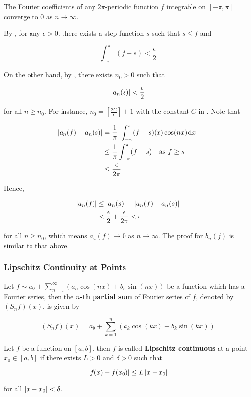 \documentclass[a4paper,12pt]{article}
\begin{document}
\begin{thm}
  The Fourier coefficients of any $2\pi$-periodic function $f$ integrable on $[-\pi,\pi]$ converge to $0$ as $n\to\infty$.\n

  \prf By \rpst[\sctd{1}], for any $\epsilon>0$, there exists a step function $s$ such that $s\leq f$ and

  $$\int_{-\pi}^{\pi}(f-s)<\frac{\epsilon}{2}$$\s

  On the other hand, by \rpst[\sctd{2}], there exists $n_{0}>0$ such that

  $$\left| a_{n}(s)\right|<\frac{\epsilon}{2}$$\s

  for all $n\geq n_{0}$. For instance, $n_{0}=[\frac{2C}{\epsilon}]+1$ with the constant $C$ in \rpst[\sctd{2}]. Note that

  $$\begin{aligned}[t]
    \left| a_{n}(f)-a_{n}(s)\right|&=\frac{1}{\pi}\left| \int_{-\pi}^{\pi}(f-s)(x)\cos(nx)\,\mathrm{d} x\right|\\
    &\leq\frac{1}{\pi}\int_{-\pi}^{\pi}(f-s)\;\;\;\;\text{as }f\geq s\\
    &\leq\frac{\epsilon}{2\pi}
  \end{aligned}$$\s

  Hence,

  $$\begin{aligned}[t]
    \left| a_{n}(f)\right|&\leq\left| a_{n}(s)\right|-\left| a_{n}(f)-a_{n}(s)\right|\\
    &<\frac{\epsilon}{2}+\frac{\epsilon}{2\pi}<\epsilon
  \end{aligned}$$\s

  for all $n\geq n_{0}$, which means $a_{n}(f)\to 0$ as $n\to\infty$. The proof for $b_{n}(f)$ is similar to that above.
\end{thm}

\subsubsection{Lipschitz Continuity at Points}
\begin{dft}
  Let $f\sim a_{0}+\sum_{n=1}^{\infty}(a_{n}\cos(nx)+b_{n}\sin(nx))$ be a function which has a Fourier series, then the \textbf{$n$-th partial sum} of Fourier series of $f$, denoted by $(S_{n}f)(x)$, is given by

  $$(S_{n}f)(x)=a_{0}+\sum_{k=1}^{n}(a_{k}\cos(kx)+b_{k}\sin(kx))$$
\end{dft}\n

\begin{dft}
  Let $f$ be a function on $[a,b]$, then $f$ is called \textbf{Lipschitz continuous} at a point $x_{0}\in[a,b]$ if there exists $L>0$ and $\delta>0$ such that

  $$\left| f(x)-f(x_{0})\right|\leq L\left| x-x_{0}\right|$$\s

  for all $\left| x-x_{0}\right|<\delta$.
\end{dft}\n
\end{document}
